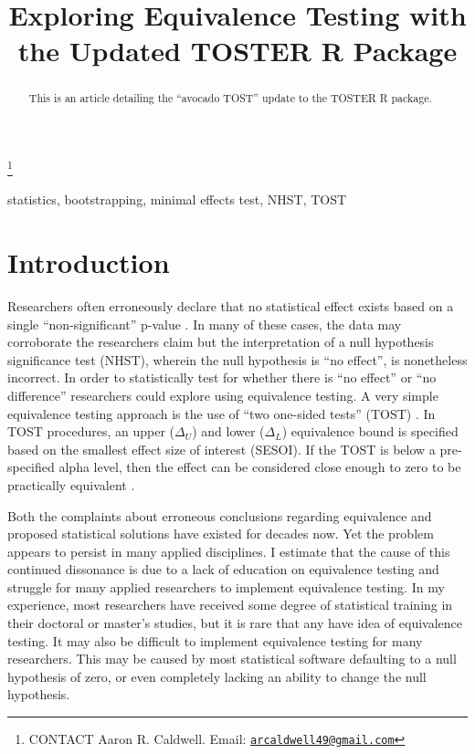 \documentclass[]{interact}
\theoremstyle{plain}%
\theoremstyle{definition}
\theoremstyle{remark}
\begin{document}

\title{Exploring Equivalence Testing with the Updated TOSTER R Package}


\author{
}

\thanks{CONTACT Aaron R.
Caldwell. Email: \href{mailto:arcaldwell49@gmail.com}{\nolinkurl{arcaldwell49@gmail.com}}}

\maketitle

\begin{abstract}
This is an article detailing the ``avocado TOST'' update to the TOSTER R
package.
\end{abstract}

\begin{keywords}
statistics, bootstrapping, minimal effects test, NHST, TOST
\end{keywords}

\hypertarget{introduction}{%
\section{Introduction}\label{introduction}}

Researchers often erroneously declare that no statistical effect exists
based on a single ``non-significant'' p-value \citep{blandaltman95}. In
many of these cases, the data may corroborate the researchers claim but
the interpretation of a null hypothesis significance test (NHST),
wherein the null hypothesis is ``no effect'', is nonetheless incorrect.
In order to statistically test for whether there is ``no effect'' or
``no difference'' researchers could explore using equivalence testing. A
very simple equivalence testing approach is the use of ``two one-sided
tests'' (TOST) \citep{schuirmann1987}. In TOST procedures, an upper
(\(\Delta_U\)) and lower (\(\Delta_L\)) equivalence bound is specified
based on the smallest effect size of interest (SESOI). If the TOST is
below a pre-specified alpha level, then the effect can be considered
close enough to zero to be practically equivalent \citep{lakens_ori}.

Both the complaints about erroneous conclusions regarding equivalence
\citep{blandaltman95} and proposed statistical solutions
\citep{schuirmann1987} have existed for decades now. Yet the problem
appears to persist in many applied disciplines. I estimate that the
cause of this continued dissonance is due to a lack of education on
equivalence testing and struggle for many applied researchers to
implement equivalence testing. In my experience, most researchers have
received some degree of statistical training in their doctoral or
master's studies, but it is rare that any have idea of equivalence
testing. It may also be difficult to implement equivalence testing for
many researchers. This may be caused by most statistical software
defaulting to a null hypothesis of zero, or even completely lacking an
ability to change the null hypothesis.
\end{document}

